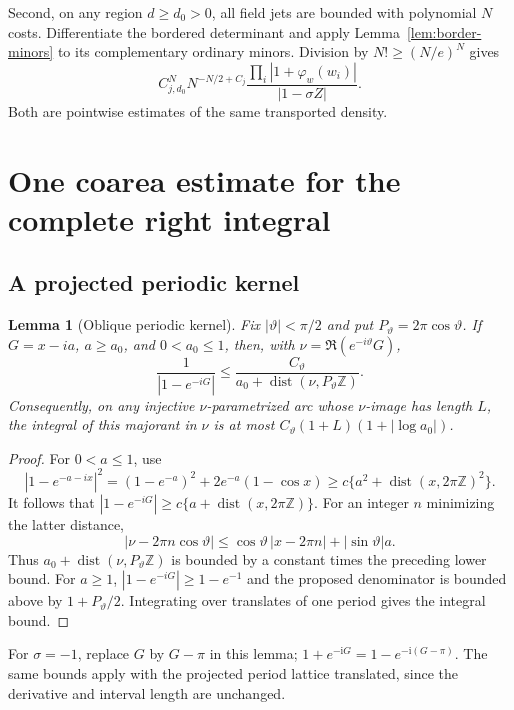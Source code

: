\documentclass[11pt]{article}
\numberwithin{equation}{section}
\newtheorem{lemma}[theorem]{Lemma}
\theoremstyle{remark}\newtheorem{remark}[theorem]{Remark}
\newcommand{\ii}{\mathrm i}
\begin{document}
Second, on any region $d\ge d_0>0$, all field jets are bounded
with polynomial $N$ costs. Differentiate the bordered determinant
and apply Lemma~\ref{lem:border-minors} to its complementary
ordinary minors. Division by $N!\ge(N/e)^N$ gives
\begin{equation}\label{eq:far-density}
 C_{j,d_0}^N N^{-N/2+C_j}
       \frac{\prod_i|1+\varphi_w(w_i)|}{|1-\sigma Z|}.
\end{equation}
Both are pointwise estimates of the same transported density.

\section{One coarea estimate for the complete right integral}\label{sec:global-integration}
\subsection{A projected periodic kernel}
\begin{lemma}[Oblique periodic kernel]\label{lem:oblique-kernel}
Fix $|\vartheta|<\pi/2$ and put $P_\vartheta=2\pi\cos\vartheta$.
If $G=x-ia$, $a\ge a_0$, and $0<a_0\le1$, then, with
$\nu=\Re(e^{-i\vartheta}G)$,
\[
 \frac1{|1-e^{-iG}|}
 \le \frac{C_\vartheta}
 {a_0+\operatorname{dist}(\nu,P_\vartheta\mathbb Z)}.
\]
Consequently, on any injective $\nu$-parametrized arc whose
$\nu$-image has length $L$, the integral of this majorant in $\nu$
is at most $C_\vartheta(1+L)(1+|\log a_0|)$.
\end{lemma}
\begin{proof}
For $0<a\le1$, use
\[
 |1-e^{-a-ix}|^2=(1-e^{-a})^2+2e^{-a}(1-\cos x)
 \ge c\{a^2+\operatorname{dist}(x,2\pi\mathbb Z)^2\}.
\]
It follows that
$|1-e^{-iG}|\ge c\{a+\operatorname{dist}(x,2\pi\mathbb Z)\}$.
For an integer $n$ minimizing the latter distance,
\[
 |\nu-2\pi n\cos\vartheta|
 \le\cos\vartheta\,|x-2\pi n|+|\sin\vartheta|a.
\]
Thus $a_0+\operatorname{dist}(\nu,P_\vartheta\mathbb Z)$ is
bounded by a constant times the preceding lower bound.
For $a\ge1$, $|1-e^{-iG}|\ge1-e^{-1}$ and the proposed
denominator is bounded above by $1+P_\vartheta/2$.
Integrating over translates of one period gives the integral bound.
\end{proof}


For $\sigma=-1$, replace $G$ by $G-\pi$ in this lemma;
$1+e^{-\ii G}=1-e^{-\ii(G-\pi)}$. The same bounds apply with the
projected period lattice translated, since the derivative and interval
length are unchanged.
\end{document}
